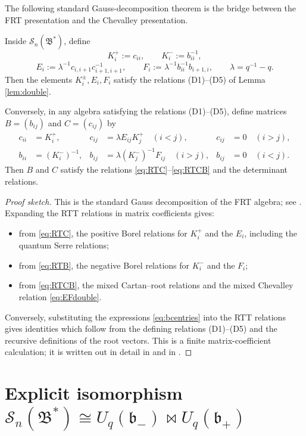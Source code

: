 \documentclass[11pt]{article}
\newcommand{\cS}{\mathcal S}
\newcommand{\fb}{\mathfrak b}
\newcommand{\Uq}{U_q}
\newcommand{\bipr}{\bowtie}
\begin{document}
The following standard Gauss-decomposition theorem is the bridge between the FRT presentation and the Chevalley presentation.

\begin{lemma}\label{lem:Gauss}
Inside \(\cS_n(\mathfrak B^*)\), define
\[
K_i^+:=c_{ii},\qquad K_i^-:=b_{ii}^{-1},
\]
\[
E_i:=\lambda^{-1}c_{i,i+1}c_{i+1,i+1}^{-1},\qquad
F_i:=\lambda^{-1}b_{ii}^{-1}b_{i+1,i},
\qquad \lambda=q^{-1}-q.
\]
Then the elements \(K_i^\pm,E_i,F_i\) satisfy the relations (D1)--(D5) of Lemma \ref{lem:double}.

Conversely, in any algebra satisfying the relations (D1)--(D5), define matrices \(B=(b_{ij})\) and \(C=(c_{ij})\) by
\begin{equation}\label{eq:bcentries}
\begin{aligned}
c_{ii}&=K_i^+, & c_{ij}&=\lambda E_{ij}K_j^+\quad(i<j), & c_{ij}&=0\quad(i>j),\\
b_{ii}&=(K_i^-)^{-1}, & b_{ij}&=\lambda (K_j^-)^{-1}F_{ij}\quad(i>j), & b_{ij}&=0\quad(i<j).
\end{aligned}
\end{equation}
Then \(B\) and \(C\) satisfy the relations \eqref{eq:RTC}--\eqref{eq:RTCB} and the determinant relations.
\end{lemma}

\begin{proof}[Proof sketch]
This is the standard Gauss decomposition of the FRT algebra; see \cite{FRT,Jo,KS}.  Expanding the RTT relations in matrix coefficients gives:
\begin{itemize}
\item from \eqref{eq:RTC}, the positive Borel relations for \(K_i^+\) and the \(E_i\), including the quantum Serre relations;
\item from \eqref{eq:RTB}, the negative Borel relations for \(K_i^-\) and the \(F_i\);
\item from \eqref{eq:RTCB}, the mixed Cartan--root relations and the mixed Chevalley relation \eqref{eq:EFdouble}.
\end{itemize}
Conversely, substituting the expressions \eqref{eq:bcentries} into the RTT relations gives identities which follow from the defining relations (D1)--(D5) and the recursive definitions of the root vectors.  This is a finite matrix-coefficient calculation; it is written out in detail in \cite[\S 9.3--9.4]{KS} and in \cite{Jo}.
\end{proof}

\section{Explicit isomorphism \(\cS_n(\mathfrak B^*)\cong \Uq(\fb_-)\bipr\Uq(\fb_+)\)}
\end{document}
